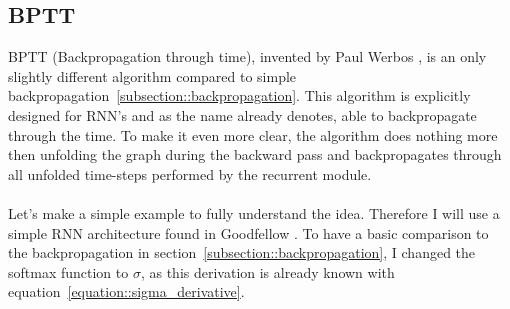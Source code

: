  \subsection{BPTT} \label{subsection::bptt}
  BPTT (Backpropagation through time), invented by Paul Werbos \cite{Werbos1990}, is an only slightly different algorithm compared to simple backpropagation~\ref{subsection::backpropagation}.
  This algorithm is explicitly designed for RNN's and as the name already denotes, able to backpropagate through the time. To make it even more clear, the algorithm does nothing more then
  unfolding the graph during the backward pass and backpropagates through all unfolded time-steps performed by the recurrent module.
  \\\\  
  Let's make a simple example to fully understand the idea.
  Therefore I will use a simple RNN architecture found in Goodfellow \cite{Goodfellow2016}. To have a basic comparison to the backpropagation in section~\ref{subsection::backpropagation}, I changed
  the softmax function to $\sigma$, as this derivation is already known with equation~\ref{equation::sigma_derivative}.
